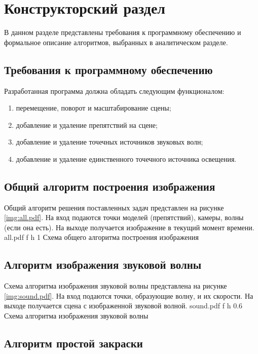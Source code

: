 \chapter{Конструкторский раздел}

В данном разделе представлены требования к программному обеспечению и формальное описание алгоритмов, выбранных в аналитическом разделе.

\section{Требования к программному обеспечению}

Разработанная программа должна обладать следующим функционалом:
\begin{enumerate}
	\item перемещение, поворот и масштабирование сцены;
	\item добавление и удаление препятствий на сцене;
	\item добавление и удаление точечных источников звуковых волн;
	\item добавление и удаление единственного точечного источника освещения.
\end{enumerate}

\section{Общий алгоритм построения изображения}

Общий алгоритм решения поставленных задач представлен на рисунке \ref{img:all.pdf}. 
На вход подаются точки моделей (препятствий), камеры, волны (если она есть).
На выходе получается изображение в текущий момент времени.
	{all.pdf}
	{f}
	{h}
	{1\textwidth}
	{Схема общего алгоритма построения изображения}

\clearpage
	
\section{Алгоритм изображения звуковой волны}

Схема алгоритма изображения звуковой волны представлена на рисунке \ref{img:sound.pdf}.
На вход подаются точки, образующие волну, и их скорости.
На выходе получается сцена с изображенной звуковой волной.
	{sound.pdf}
	{f}
	{h}
	{0.6\textwidth}
	{Схема алгоритма изображения звуковой волны}
	
\clearpage
	
\section{Алгоритм простой закраски}

